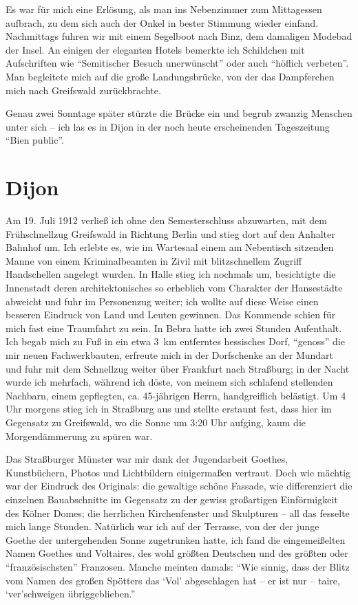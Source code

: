 Es war für mich eine Erlösung, als man ins Nebenzimmer zum Mittagessen aufbrach, zu dem sich auch der Onkel in bester Stimmung wieder einfand. Nachmittags fuhren wir mit einem Segelboot nach Binz, dem damaligen Modebad der Insel. An einigen der eleganten Hotels bemerkte ich Schildchen mit Aufschriften wie \enquote{Semitischer Besuch unerwünscht} oder auch \enquote{höflich verbeten}. Man begleitete mich auf die große Landungsbrücke, von der das Dampferchen mich nach Greifswald zurückbrachte.

Genau zwei Sonntage später stürzte die Brücke ein und begrub zwanzig Menschen unter sich -- ich las es in Dijon in der noch heute erscheinenden Tageszeitung \enquote{Bien public}.


\section{Dijon}

Am 19. Juli 1912 verließ ich ohne den Semesterschluss abzuwarten, mit dem Frühschnellzug Greifswald in Richtung Berlin und stieg dort auf den Anhalter Bahnhof um. Ich erlebte es, wie im Wartesaal einem am Nebentisch sitzenden Manne von einem Kriminalbeamten in Zivil mit blitzschnellem Zugriff Handschellen angelegt wurden. In Halle stieg ich nochmals um, besichtigte die Innenstadt deren architektonisches so erheblich vom Charakter der Hansestädte abweicht und fuhr im Personenzug weiter; ich wollte auf diese Weise einen besseren Eindruck von Land und Leuten gewinnen. Das Kommende schien für mich fast eine Traumfahrt zu sein. In Bebra hatte ich zwei Stunden Aufenthalt. Ich begab mich zu Fuß in ein etwa 3~km entferntes hessisches Dorf, \enquote{genoss} die mir neuen Fachwerkbauten, erfreute mich in der Dorfschenke an der Mundart und fuhr mit dem Schnellzug weiter über Frankfurt nach Straßburg; in der Nacht wurde ich mehrfach, während ich döste, von meinem sich schlafend stellenden Nachbarn, einem gepflegten, ca. 45-jährigen Herrn, handgreiflich belästigt. Um 4 Uhr morgens stieg ich in Straßburg aus und stellte erstaunt fest, dass hier im Gegensatz zu Greifswald, wo die Sonne um 3:20 Uhr aufging, kaum die Morgendämmerung zu spüren war.

Das Straßburger Münster war mir dank der Jugendarbeit Goethes, Kunstbüchern, Photos und Lichtbildern einigermaßen vertraut. Doch wie mächtig war der Eindruck des Originals: die gewaltige schöne Fassade, wie differenziert die einzelnen Bauabschnitte im Gegensatz zu der gewiss großartigen Einförmigkeit des Kölner Domes; die herrlichen Kirchenfenster und Skulpturen -- all das fesselte mich lange Stunden. Natürlich war ich auf der Terrasse, von der der junge Goethe der untergehenden Sonne zugetrunken hatte, ich fand die eingemeißelten Namen Goethes und Voltaires, des wohl größten Deutschen und des größten oder \enquote{französischsten} Franzosen. Manche meinten damals: \enquote{Wie sinnig, dass der Blitz vom Namen des großen Spötters das \enquote{Vol} abgeschlagen hat -- er ist nur -- taire, \enquote{ver}schweigen übriggeblieben.}

